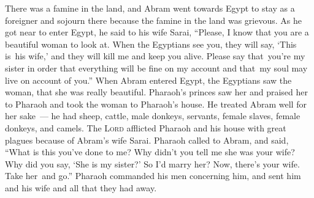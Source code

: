 \begin{inparaenum}
     There was a famine in the land, and Abram went towards Egypt to stay as a foreigner and sojourn there because the famine in the land was grievous.%
     As he got near to enter Egypt, he said to his wife Sarai, ``Please, I know that you are a beautiful woman to look at.%
     When the Egyptians see you, they will say, `This is\understood\ his wife,' and they will kill me and keep you alive.%
     Please say that\understood\ you're my sister in order that everything will be fine on my account and that\understood\ my soul may live on account of you.''%
     When Abram entered Egypt, the Egyptians saw the woman, that she was really beautiful.%
     Pharaoh's princes saw her and praised her to Pharaoh and took the woman to Pharaoh's house.%
     He treated Abram well for her sake~--- he had sheep, cattle, male donkeys, servants, female slaves, female donkeys, and camels.%
     The \textsc{Lord} afflicted Pharaoh and his house with great plagues because of Abram's wife Sarai.%
     Pharaoh called to Abram, and said, ``What is this you've done to me? Why didn't you tell me she was your wife?%
     Why did you say, `She is my sister?' So I'd marry her? Now, there's your wife. Take her\understood\ and go.''%
     Pharaoh commanded his men concerning him, and sent him and his wife and all that they had away.%
\end{inparaenum}
